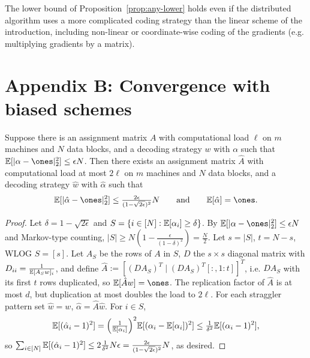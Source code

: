 \begin{proposition}
  \label{prop:lower-robust}
  \notready
  The lower bound of Proposition~\ref{prop:any-lower} holds even if the
  distributed algorithm uses a more complicated coding strategy than the linear
  scheme of the introduction, including non-linear or coordinate-wise coding of
  the gradients (e.g. multiplying gradients by a matrix).
\end{proposition}

\chapter{Appendix B: Convergence with biased schemes}

\begin{proposition}
  \label{prop:debias}
  Suppose there is an assignment matrix $A$ with computational load $\ell$ on
  $m$ machines and $N$ data blocks, and a decoding strategy $w$ with $\alpha$
  such that $\E[|\alpha - \ones|_2^2] \le \epsilon N$. Then there exists an
  assignment matrix $\hat A$ with computational load at most $2\ell$ on $m$
  machines and $N$ data blocks, and a decoding strategy $\hat w$ with $\hat\alpha$
  such that
  \[
    \E[|\hat\alpha - \ones|_2^2] \le \tfrac{2\epsilon}{(1 - \sqrt{2\epsilon})^2}N
    \qquad\text{and}\qquad \E[\hat\alpha] = \ones .
  \]
\end{proposition}
\begin{proof}
  Let $\delta = 1 - \sqrt{2\epsilon}$ and $S = \{i \in [N] : \mathbb{E}[\alpha_i] \ge \delta\}$.
  By $\E[|\alpha - \ones|_2^2] \le \epsilon N$ and Markov-type counting,
  $|S| \ge N(1 - \tfrac{\epsilon}{(1-\delta)^2}) = \tfrac N2$. Let $s = |S|$,
  $t = N - s$, WLOG $S = [s]$. Let $A_S$ be the rows of $A$ in $S$, $D$ the
  $s \times s$ diagonal matrix with $D_{ii} = \tfrac1{\mathbb{E}[A_S w]_i}$, and define
  $\hat A := [(DA_S)^T \mid (DA_S)^T[:,1{:}t]]^T$, i.e. $DA_S$ with its first $t$
  rows duplicated, so $\E[\hat A w] = \ones$. The replication factor of $\hat A$
  is at most $d$, but duplication at most doubles the load to $2\ell$. For each
  straggler pattern set $\hat w = w$, $\hat\alpha = \hat A\hat w$. For $i \in S$,
  \[
    \mathbb{E}[(\hat\alpha_i - 1)^2]
      = \Big(\tfrac1{\mathbb{E}[\alpha_i]}\Big)^2\mathbb{E}[(\alpha_i - \mathbb{E}[\alpha_i])^2]
      \le \tfrac1{\delta^2}\mathbb{E}[(\alpha_i - 1)^2],
  \]
  so $\sum_{i\in[N]}\mathbb{E}[(\hat\alpha_i - 1)^2] \le 2\tfrac1{\delta^2}N\epsilon
  = \tfrac{2\epsilon}{(1-\sqrt{2\epsilon})^2}N$, as desired.
\end{proof}

